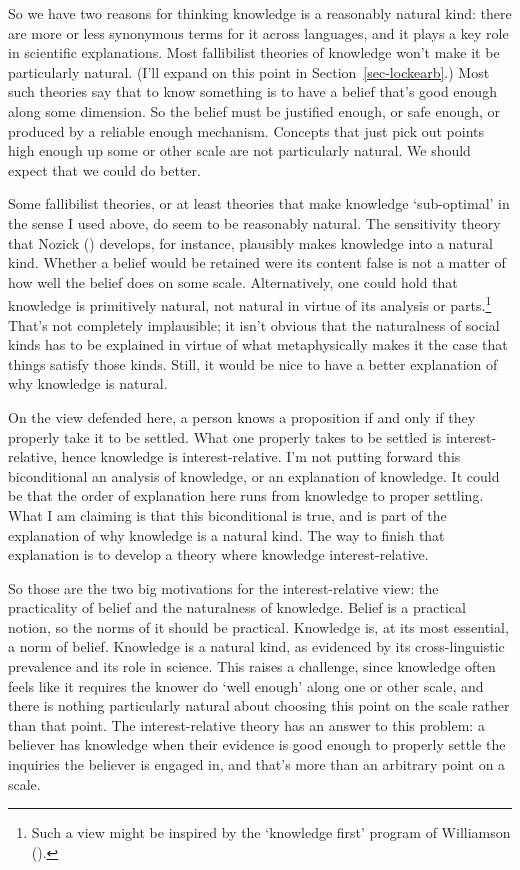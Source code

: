 \documentclass[
  10pt,
  letterpaper,
  twoside]{scrbook}
\begin{document}
So we have two reasons for thinking knowledge is a reasonably natural
kind: there are more or less synonymous terms for it across languages,
and it plays a key role in scientific explanations. Most fallibilist
theories of knowledge won't make it be particularly natural. (I'll
expand on this point in Section~\ref{sec-lockearb}.) Most such theories
say that to know something is to have a belief that's good enough along
some dimension. So the belief must be justified enough, or safe enough,
or produced by a reliable enough mechanism. Concepts that just pick out
points high enough up some or other scale are not particularly natural.
We should expect that we could do better.

Some fallibilist theories, or at least theories that make knowledge
`sub-optimal' in the sense I used above, do seem to be reasonably
natural. The sensitivity theory that Nozick
() develops, for instance, plausibly
makes knowledge into a natural kind. Whether a belief would be retained
were its content false is not a matter of how well the belief does on
some scale. Alternatively, one could hold that knowledge is primitively
natural, not natural in virtue of its analysis or parts.\footnote{Such a
  view might be inspired by the `knowledge first' program of Williamson
  ().} That's not completely
implausible; it isn't obvious that the naturalness of social kinds has
to be explained in virtue of what metaphysically makes it the case that
things satisfy those kinds. Still, it would be nice to have a better
explanation of why knowledge is natural.

On the view defended here, a person knows a proposition if and only if
they properly take it to be settled. What one properly takes to be
settled is interest-relative, hence knowledge is interest-relative. I'm
not putting forward this biconditional an analysis of knowledge, or an
explanation of knowledge. It could be that the order of explanation here
runs from knowledge to proper settling. What I am claiming is that this
biconditional is true, and is part of the explanation of why knowledge
is a natural kind. The way to finish that explanation is to develop a
theory where knowledge interest-relative.

So those are the two big motivations for the interest-relative view: the
practicality of belief and the naturalness of knowledge. Belief is a
practical notion, so the norms of it should be practical. Knowledge is,
at its most essential, a norm of belief. Knowledge is a natural kind, as
evidenced by its cross-linguistic prevalence and its role in science.
This raises a challenge, since knowledge often feels like it requires
the knower do `well enough' along one or other scale, and there is
nothing particularly natural about choosing this point on the scale
rather than that point. The interest-relative theory has an answer to
this problem: a believer has knowledge when their evidence is good
enough to properly settle the inquiries the believer is engaged in, and
that's more than an arbitrary point on a scale.
\end{document}
